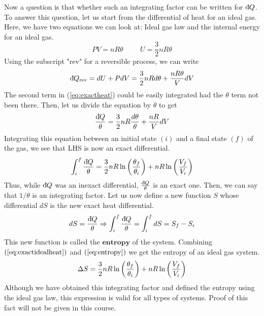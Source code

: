     Now a question is that whether such an integrating factor can be written for $\text{d}\hspace*{-0.13em}\bar{}\hspace*{0.1em} Q$. To answer this question, let us start from the differential of heat for an ideal gas. Here, we have two equations we can look at: Ideal gas law and the internal energy for an ideal gas.
    \begin{equation}
        PV=nR\theta \hspace{1cm} U=\frac{3}{2}nR\theta
    \end{equation}
    Using the subscript "rev" for a reversible process, we can write 
    \begin{equation}
        \text{d}\hspace*{-0.13em}\bar{}\hspace*{0.1em} Q_\text{rev} = dU + PdV = \frac{3}{2}nRd\theta + \frac{nR\theta}{V}dV
        \label{eq:exactheat}
    \end{equation}  
    The second term in (\ref{eq:exactheat}) could be easily integrated had the $\theta$ term not been there. Then, let us divide the equation by $\theta$ to get
    \begin{equation}
        \frac{\text{d}\hspace*{-0.13em}\bar{}\hspace*{0.1em} Q}{\theta} = \frac{3}{2}nR\frac{d\theta}{\theta} + \frac{nR}{V}dV
    \end{equation}
    Integrating this equation between an initial state $(i)$ and a final state $(f)$ of the gas, we see that LHS is now an exact differential. 
    \begin{equation}
        \int_i^f\frac{\text{d}\hspace*{-0.13em}\bar{}\hspace*{0.1em} Q}{\theta} = \frac{3}{2}nR\ln\left( \frac{\theta_f}{\theta_i} \right)+nR\ln\left( \frac{V_f}{V_i} \right)
        \label{eq:exactidealheat}
    \end{equation}
    Thus, while $\text{d}\hspace*{-0.13em}\bar{}\hspace*{0.1em} Q$ was an inexact differential, $\frac{\text{d}\hspace*{-0.13em}\bar{}\hspace*{0.1em} Q}{\theta}$ is an exact one. Then, we can say that $1/\theta$ is an integrating factor. Let us now define a new function $S$ whose differential $dS$ is the new exact heat differential.
    \begin{equation}
        dS = \frac{\text{d}\hspace*{-0.13em}\bar{}\hspace*{0.1em} Q}{\theta} \Rightarrow \int_i^f\frac{\text{d}\hspace*{-0.13em}\bar{}\hspace*{0.1em} Q}{\theta} = \int_i^fdS = S_f-S_i
        \label{eq:entropy}
    \end{equation}
\newpage
    This new function is called the $\textbf{entropy}$ of the system. Combining $(\ref{eq:exactidealheat})$ and $(\ref{eq:entropy})$ we get the entropy of an ideal gas system.
    \begin{equation}
        \Delta S = \frac{3}{2}nR\ln\left( \frac{\theta_f}{\theta_i} \right)+nR\ln\left( \frac{V_f}{V_i} \right)
        \label{eq:entropydefn}
    \end{equation}
    Although we have obtained this integrating factor and defined the entropy using the ideal gas law, this expression is valid for all types of systems. Proof of this fact will not be given in this course. \\

